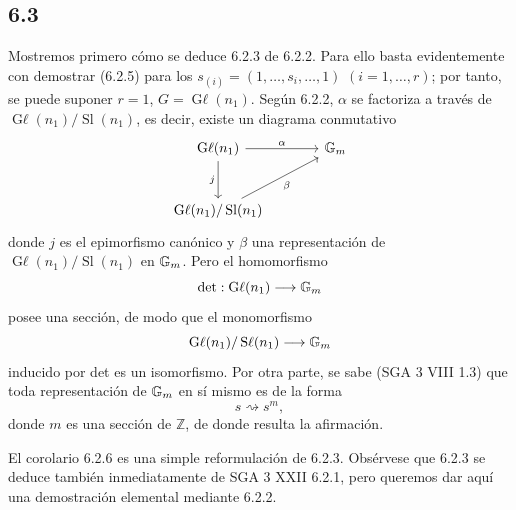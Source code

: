 \subsection*{6.3}
Mostremos primero cómo se deduce 6.2.3 de 6.2.2. Para ello basta
evidentemente con demostrar (6.2.5) para los
\(s_{(i)}=(1,\ldots,s_i,\ldots,1)\) \((i=1,\ldots,r)\); por tanto, se puede
suponer \(r=1\), \(G=\operatorname{G\ell}(n_1)\). Según 6.2.2, \(\alpha\)
se factoriza a través de
\(\operatorname{G\ell}(n_1)/\operatorname{Sl}(n_1)\), es decir, existe un
diagrama conmutativo
\[
\begin{tikzcd}[column sep=large,row sep=large]
\operatorname{G\ell}(n_1) \arrow[r,"\alpha"] \arrow[d,"j"'] & \Gm\\
\operatorname{G\ell}(n_1)/\operatorname{Sl}(n_1) \arrow[ur,"\beta"'] &
\end{tikzcd}
\]
donde \(j\) es el epimorfismo canónico y \(\beta\) una representación de
\(\operatorname{G\ell}(n_1)/\operatorname{Sl}(n_1)\) en \(\Gm\). Pero el
homomorfismo
\[
 \det:\operatorname{G\ell}(\sisi{n_i}{n_1})\longrightarrow\Gm %
\]
posee una sección, de modo que el monomorfismo
\[
 \operatorname{G\ell}(\sisi{n_i}{n_1})/\operatorname{S\ell}(\sisi{n_i}{n_1})\longrightarrow\Gm
\]
inducido por det es un isomorfismo. Por otra parte, se sabe (SGA 3 VIII 1.3)
que toda representación de \(\Gm\) en sí mismo es de la forma
\[
 s\rightsquigarrow s^m,
\]
donde \(m\) es una sección de \(\mathbb Z\), de donde resulta la afirmación.

El corolario 6.2.6 es una simple reformulación de 6.2.3. Obsérvese que 6.2.3
se deduce también inmediatamente de SGA 3 XXII 6.2.1, pero queremos dar aquí
una demostración elemental mediante 6.2.2\sisi{)}{}. %

